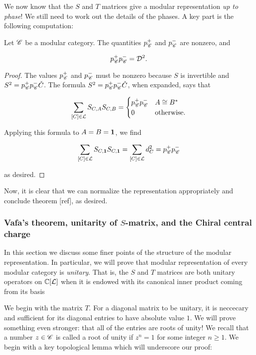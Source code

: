 We now know that the $S$ and $T$ matrices give a modular representation \textit{up to phase}! We still need to work out the details of the phases. A key part is the following computation:

\begin{corollary} Let $\mathscr{C}$ be a modular category. The quantities $p_{\mathscr{C}}^{+}$ and $p_{\mathscr{C}}^{-}$ are nonzero, and

$$p_{\mathscr{C}}^+p_{\mathscr{C}}^{-}=\mathcal{D}^2.$$

\end{corollary}
\begin{proof}The values $p_{\mathscr{C}}^{+}$ and $p_{\mathscr{C}}^{-}$ must be nonzero because $S$ is invertible and $S^2=p_{\mathscr{C}}^{+}p_{\mathscr{C}}^{-}\check{C}$. The formula $S^2=p_{\mathscr{C}}^{+}p_{\mathscr{C}}^{-}\check{C}$, when expanded, says that

$$
\sum_{[C]\in \mathcal{L}}S_{C,A}S_{C,B}=
\begin{cases}
p_{\mathscr{C}}^{+}p_{\mathscr{C}}^- & A\cong B^*\\
0 & \text{otherwise}.
\end{cases}
$$

Applying this formula to $A=B=\mathbf{1}$, we find

$$\sum_{[C]\in \mathcal{L}}S_{C,\mathbf{1}}S_{C,\mathbf{1}}=\sum_{[C]\in\mathcal{L}}d_{C}^2=p_{\mathscr{C}}^{+}p_{\mathscr{C}}^-$$

as desired.
\end{proof}

Now, it is clear that we can normalize the representation appropriately and conclude theorem [ref], as desired.

\subsubsection{Vafa's theorem, unitarity of $S$-matrix, and the Chiral central charge}

In this section we discuss some finer points of the structure of the modular representation. In particular, we will prove that modular representation of every modular category is \textit{unitary}. That is, the $S$ and $T$ matrices are both unitary operators on $\mathbb{C}[\mathcal{L}]$ when it is endowed with its canonical inner product coming from its basis

We begin with the matrix $T$. For a diagonal matrix to be unitary, it is neccecary and sufficient for its diagonal entries to have absolute value $1$. We will prove something even stronger: that all of the entries are roots of unity! We recall that a number $z\in \mathscr{C}$ is called a root of unity if $z^n=1$ for some integer $n\geq 1$. We begin with a key topological lemma which will underscore our proof:

